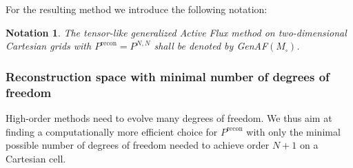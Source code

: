 \documentclass[12pt,a4paper]{article}
\newtheorem{notation}{Notation}
\begin{document}
For the resulting method we introduce the following notation:
\begin{notation}
\label{Not_GenAFMTens}
	The \emph{tensor-like} generalized Active Flux method on two-dimensional Cartesian grids with $P^\mathrm{recon}=P^{N,N}$ shall be denoted by \emph{GenAF$(M_\square)$}.
\end{notation}



\subsubsection{Reconstruction space with minimal number of degrees of freedom}
High-order methods need to evolve many degrees of freedom. We thus aim at finding a computationally more efficient choice for \(P^\mathrm{recon}\) with only the minimal possible number of degrees of freedom needed to achieve order \(N+1\) on a Cartesian cell.
\end{document}
